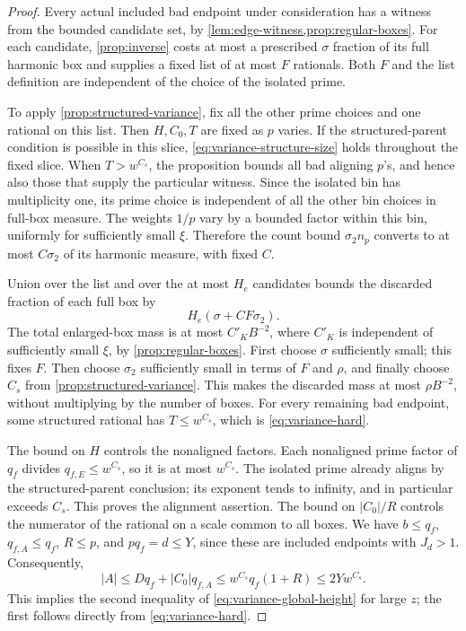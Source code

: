 \begin{proof}
Every actual included bad endpoint under consideration has a witness
from the bounded candidate set, by
\cref{lem:edge-witness,prop:regular-boxes}.
For each candidate, \cref{prop:inverse} costs at most a prescribed
\(\sigma\) fraction of its full harmonic box and supplies a fixed list
of at most \(F\) rationals. Both \(F\) and the list definition are
independent of the choice of the isolated prime.

To apply \cref{prop:structured-variance}, fix all the other prime choices
and one rational on this list. Then \(H,C_0,T\) are fixed as \(p\) varies.
If the structured-parent condition is possible in this slice,
\eqref{eq:variance-structure-size} holds throughout the fixed slice.
When \(T>w^{C_s}\), the proposition bounds all bad aligning \(p\)'s,
and hence also those that supply the particular witness.
Since the isolated bin has multiplicity one, its prime choice is
independent of all the other bin choices in full-box measure.
The weights \(1/p\) vary by a bounded factor within this bin, uniformly
for sufficiently small \(\xi\). Therefore the count bound
\(\sigma_2n_p\) converts to at most \(C\sigma_2\) of its harmonic
measure, with fixed \(C\).

Union over the list and over the at most \(H_e\) candidates bounds the
discarded fraction of each full box by
\[
 H_e(\sigma+CF\sigma_2).
\]
The total enlarged-box mass is at most \(C'_K B^{-2}\), where \(C'_K\)
is independent of sufficiently small \(\xi\), by
\cref{prop:regular-boxes}. First choose \(\sigma\) sufficiently small;
this fixes \(F\). Then choose \(\sigma_2\) sufficiently small in terms
of \(F\) and \(\rho\), and finally choose \(C_s\) from
\cref{prop:structured-variance}. This makes the discarded mass at most
\(\rho B^{-2}\), without multiplying by the number of boxes.
For every remaining bad endpoint, some structured rational has
\(T\le w^{C_s}\), which is \eqref{eq:variance-hard}.

The bound on \(H\) controls the nonaligned factors. Each nonaligned
prime factor of \(q_f\) divides \(q_{f,E}\le w^{C_s}\), so it is at
most \(w^{C_s}\).
The isolated prime already aligns by the structured-parent conclusion;
its exponent tends to infinity, and in particular exceeds \(C_s\).
This proves the alignment assertion.
The bound on \(|C_0|/R\) controls the numerator of the rational on a
scale common to all boxes. We have \(b\le q_f\), \(q_{f,A}\le q_f\),
\(R\le p\), and
\(pq_f=d\le Y\), since these are included endpoints with \(J_d>1\).
Consequently,
\[
 |A|\le Dq_f+|C_0|q_{f,A}
 \le w^{C_s}q_f(1+R)
 \le 2Yw^{C_s}.
\]
This implies the second inequality of
\eqref{eq:variance-global-height} for large \(z\); the first follows
directly from \eqref{eq:variance-hard}.
\end{proof}

